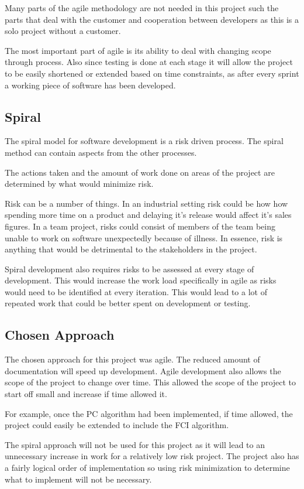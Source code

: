 \documentclass{UoYCSproject}
\begin{document}
Many parts of the agile methodology are not needed in this project such the parts that deal with the customer and cooperation between developers as this is a solo project without a customer.

The most important part of agile is its ability to deal with changing scope through process. Also since testing is done at each stage it will allow the project to be easily shortened or extended based on time constraints, as after every sprint a working piece of software has been developed.

\subsection{Spiral}
The spiral model for software development is a risk driven process. The spiral method can contain aspects from the other processes.

The actions taken and the amount of work done on areas of the project are determined by what would minimize risk.

Risk can be a number of things. In an industrial setting risk could be how how spending more time on a product and delaying it's release would affect it's sales figures. In a team project, risks could  consist of members of the team being unable to work on software unexpectedly because of illness. In essence, risk is anything that would be detrimental to the stakeholders in the project.

Spiral development also requires risks to be assessed at every stage of development. This would increase the work load specifically in agile as risks would need to be identified at every iteration. This would lead to a lot of repeated work that could be better spent on development or testing.  
\subsection{Chosen Approach}

The chosen approach for this project was agile. The reduced amount of documentation will speed up development. Agile development also allows the scope of the project to change over time. This allowed the scope of the project to start off small and increase if time allowed it.

For example, once the PC algorithm had been implemented, if time allowed, the project could easily be extended to include the FCI algorithm.

The spiral approach will not be used for this project as it will lead to an unnecessary increase in work for a relatively low risk project. The project also has a fairly logical order of implementation so using risk minimization to determine what to implement will not be necessary.
\end{document}
